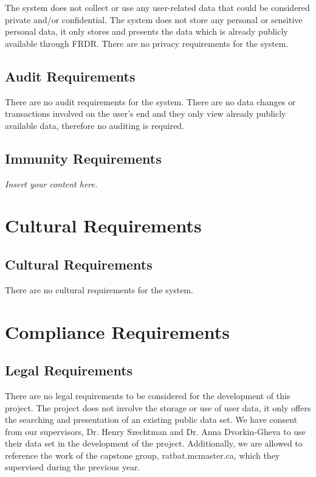 \documentclass[12pt]{article}
\newcommand{\lips}{\textit{Insert your content here.}}
\begin{document}
\par{The system does not collect or use any user-related data that could be considered private and/or confidential. \newline \indent
The system does not store any personal or sensitive personal data, it only stores and presents the data which is already 
publicly available through FRDR. \newline \indent There are no privacy requirements for the system.}

\subsection{Audit Requirements}

\par{There are no audit requirements for the system. There are no data changes or transactions involved on the user's end 
and they only view already publicly available data, therefore no auditing is required.}

\subsection{Immunity Requirements}
\lips

\section{Cultural Requirements}
\subsection{Cultural Requirements}
\par{There are no cultural requirements for the system.}

\section{Compliance Requirements}
\subsection{Legal Requirements}

\par{There are no legal requirements to be considered for the development of this project. The project does not involve the storage or 
use of user data, it only offers the searching and presentation of an existing public data set. \newline \indent We have consent from our 
supervisors, Dr. Henry Szechtman and Dr. Anna Dvorkin-Gheva to use their data set in the development of the project. Additionally, 
we are allowed to reference the work of the capstone group, ratbat.mcmaster.ca, which they supervised during the previous year.}
\end{document}
